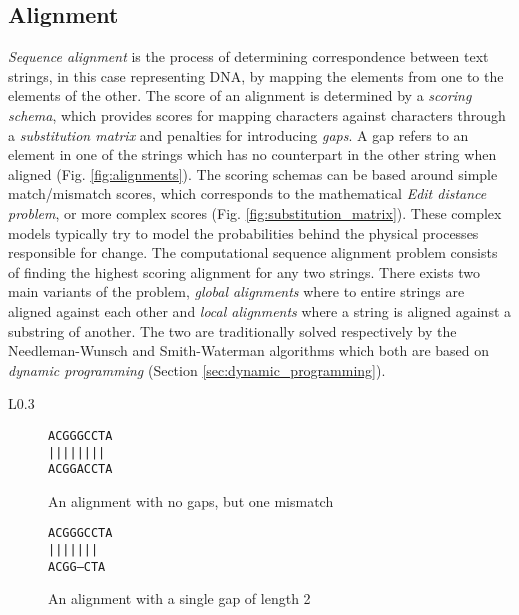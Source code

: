 \documentclass[thesis.tex]{subfiles}
\begin{document}
\subsection{Alignment}
\textit{Sequence alignment} is the process of determining correspondence between text strings, in this case representing DNA, by mapping the elements from one to the elements of the other. The score of an alignment is determined by a \textit{scoring schema}, which provides scores for mapping characters against characters through a \textit{substitution matrix} and penalties for introducing \textit{gaps}. A gap refers to an element in one of the strings which has no counterpart in the other string when aligned (Fig. \ref{fig:alignments}). The scoring schemas can be based around simple match/mismatch scores, which corresponds to the mathematical \textit{Edit distance problem}, or more complex scores (Fig. \ref{fig:substitution_matrix}). These complex models typically try to model the probabilities behind the physical processes responsible for change. The computational sequence alignment problem consists of finding the highest scoring alignment for any two strings. There exists two main variants of the problem, \textit{global alignments} where to entire strings are aligned against each other and \textit{local alignments} where a string is aligned against a substring of another. The two are traditionally solved respectively by the Needleman-Wunsch and Smith-Waterman algorithms which both are based on \textit{dynamic programming} (Section \ref{sec:dynamic_programming}).
\begin{wrapfigure}{L}{0.3\textwidth}
  \begin{subfigure}[t]{\textwidth}
    \begin{mdframed}
      \begin{center}
        \texttt{ACGGGCCTA}\\
        \texttt{||||\space||||}\\
        \texttt{ACGGACCTA}
      \end{center}
    \end{mdframed}
    \caption{An alignment with no gaps, but one mismatch}
  \end{subfigure}
  \begin{subfigure}[b]{\textwidth}
    \begin{mdframed}
      \begin{center}
        \texttt{ACGGGCCTA}\\
        \texttt{||||\space\space|||}\\
        \texttt{ACGG---CTA}
      \end{center}
    \end{mdframed}
    \caption{An alignment with a single gap of length 2}
  \end{subfigure}
  \caption{Examples of aligned text strings}
  \label{fig:alignments}
\end{wrapfigure}
\end{document}
